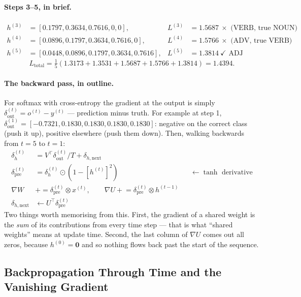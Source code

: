 \documentclass[11pt,a4paper]{article}
\begin{document}
\paragraph{Steps 3--5, in brief.}
\begin{align*}
h^{(3)} &= [0.1797, 0.3634, 0.7616, 0, 0], & L^{(3)} &= 1.5687 \ \times \text{ (VERB, true NOUN)} \\
h^{(4)} &= [0.0896, 0.1797, 0.3634, 0.7616, 0], & L^{(4)} &= 1.5766 \ \times \text{ (ADV, true VERB)} \\
h^{(5)} &= [0.0448, 0.0896, 0.1797, 0.3634, 0.7616], & L^{(5)} &= 1.3814 \ \checkmark \text{ ADJ}
\end{align*}
\[
L_{\text{total}} = \tfrac{1}{5}(1.3173 + 1.3531 + 1.5687 + 1.5766 + 1.3814) = 1.4394 .
\]

\paragraph{The backward pass, in outline.} For softmax with cross-entropy the gradient at the
output is simply $\delta_{\text{out}}^{(t)} = o^{(t)} - y^{(t)}$ --- prediction minus truth.
For example at step 1, $\delta^{(1)}_{\text{out}} = [-0.7321, 0.1830, 0.1830, 0.1830, 0.1830]$:
negative on the correct class (push it up), positive elsewhere (push them down). Then, walking
backwards from $t=5$ to $t=1$:
\begin{align*}
\delta_h^{(t)} &= V^\top \delta_{\text{out}}^{(t)}/T + \delta_{h,\text{next}} \\
\delta_{\text{pre}}^{(t)} &= \delta_h^{(t)} \odot \left(1 - [h^{(t)}]^2\right) && \leftarrow \tanh \text{ derivative} \\
\nabla W &\mathrel{+}= \delta_{\text{pre}}^{(t)} \otimes x^{(t)}, \qquad
\nabla U \mathrel{+}= \delta_{\text{pre}}^{(t)} \otimes h^{(t-1)} \\
\delta_{h,\text{next}} &\leftarrow U^\top \delta_{\text{pre}}^{(t)}
\end{align*}
Two things worth memorising from this. First, the gradient of a shared weight is the
\emph{sum} of its contributions from every time step --- that is what ``shared weights''
means at update time. Second, the last column of $\nabla U$ comes out all zeros, because
$h^{(0)} = \mathbf{0}$ and so nothing flows back past the start of the sequence.

\subsection{Backpropagation Through Time and the Vanishing Gradient}
\end{document}
